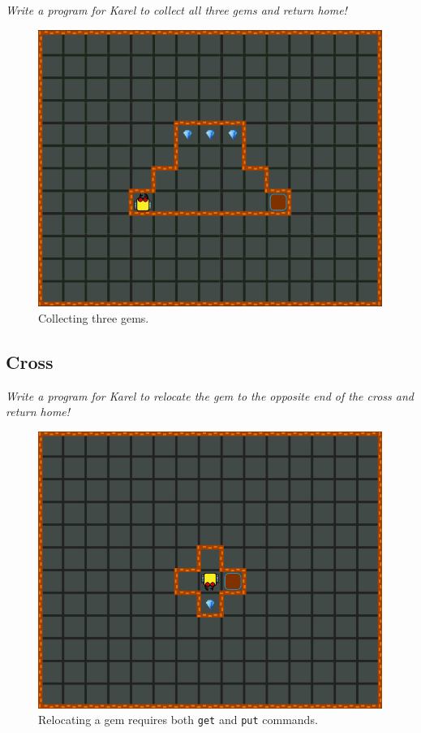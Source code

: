 {{{\em Write a program for Karel to collect all three gems and return home!}

\vspace{-3mm}
\begin{figure}[!ht]
\begin{center}
\includegraphics[height=0.4\textwidth]{img/a26.png}
\end{center}
\vspace{-4mm}
\caption{Collecting three gems.}
\label{fig:a26}
\vspace{-4mm}
\end{figure}



\subsection{Cross}

{\em Write a program for Karel to relocate the gem to the opposite 
end of the cross and return home!}

\begin{figure}[!ht]
\begin{center}
\includegraphics[height=0.4\textwidth]{img/b04.png}
\end{center}
\vspace{-4mm}
\caption{Relocating a gem requires both {\tt get} and {\tt put} commands.}
\label{fig:b04}
\vspace{-1cm}
\end{figure}

}}
